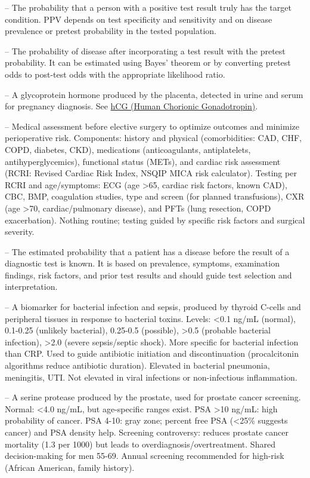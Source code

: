 -- The probability that a person with a positive test result truly has the target condition. PPV depends on test specificity and sensitivity and on disease prevalence or pretest probability in the tested population.

-- The probability of disease after incorporating a test result with the pretest probability. It can be estimated using Bayes’ theorem or by converting pretest odds to post-test odds with the appropriate likelihood ratio.

-- A glycoprotein hormone produced by the placenta, detected in urine and serum for pregnancy diagnosis. See \hyperlink{hCG (Human Chorionic Gonadotropin)}{hCG (Human Chorionic Gonadotropin)}.

-- Medical assessment before elective surgery to optimize outcomes and minimize perioperative risk. Components: history and physical (comorbidities: CAD, CHF, COPD, diabetes, CKD), medications (anticoagulants, antiplatelets, antihyperglycemics), functional status (METs), and cardiac risk assessment (RCRI: Revised Cardiac Risk Index, NSQIP MICA risk calculator). Testing per RCRI and age/symptoms: ECG (age >65, cardiac risk factors, known CAD), CBC, BMP, coagulation studies, type and screen (for planned transfusions), CXR (age >70, cardiac/pulmonary disease), and PFTs (lung resection, COPD exacerbation). Nothing routine; testing guided by specific risk factors and surgical severity.

-- The estimated probability that a patient has a disease before the result of a diagnostic test is known. It is based on prevalence, symptoms, examination findings, risk factors, and prior test results and should guide test selection and interpretation.

-- A biomarker for bacterial infection and sepsis, produced by thyroid C-cells and peripheral tissues in response to bacterial toxins. Levels: <0.1 ng/mL (normal), 0.1-0.25 (unlikely bacterial), 0.25-0.5 (possible), >0.5 (probable bacterial infection), >2.0 (severe sepsis/septic shock). More specific for bacterial infection than CRP. Used to guide antibiotic initiation and discontinuation (procalcitonin algorithms reduce antibiotic duration). Elevated in bacterial pneumonia, meningitis, UTI. Not elevated in viral infections or non-infectious inflammation.

-- A serine protease produced by the prostate, used for prostate cancer screening. Normal: <4.0 ng/mL, but age-specific ranges exist. PSA >10 ng/mL: high probability of cancer. PSA 4-10: gray zone; percent free PSA (<25\% suggests cancer) and PSA density help. Screening controversy: reduces prostate cancer mortality (1.3 per 1000) but leads to overdiagnosis/overtreatment. Shared decision-making for men 55-69. Annual screening recommended for high-risk (African American, family history).

